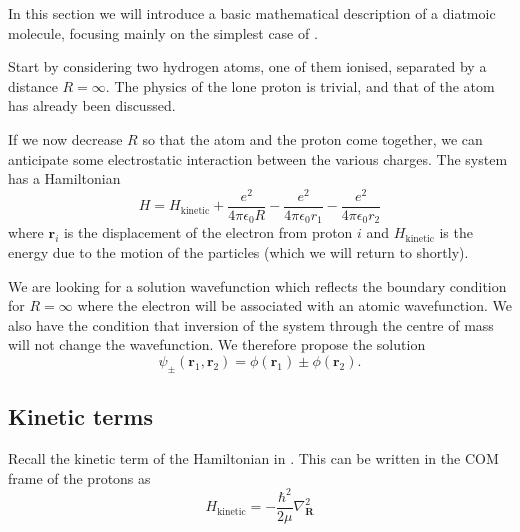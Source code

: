 In this section we will introduce a basic mathematical description of a diatmoic
molecule, focusing mainly on the simplest case of .

Start by considering two hydrogen atoms, one of them ionised, separated by a
distance $R = \infty$. The physics of the lone proton is trivial, and that of
the atom has already been discussed.

If we now decrease $R$ so that the atom and the proton come together, we can
anticipate some electrostatic interaction between the various charges. The
system has a Hamiltonian
%
\begin{equation}
  H = H_\text{kinetic} + \frac{e^2}{4\pi\epsilon_0 R} -
  \frac{e^2}{4\pi\epsilon_0 r_1} - \frac{e^2}{4\pi\epsilon_0 r_2}
\end{equation}
%
where $\mathbf{r}_i$ is the displacement of the electron from proton $i$ and
$H_\text{kinetic}$ is the energy due to the motion of the particles (which we
will return to shortly).

We are looking for a solution wavefunction which reflects the boundary condition
for $R=\infty$ where the electron will be associated with an atomic
wavefunction. We also have the condition that inversion of the system through
the centre of mass will not change the wavefunction. We therefore propose the
solution
%
\begin{equation}
  \psi_\pm(\mathbf{r}_1, \mathbf{r}_2) = \phi(\mathbf{r}_1) \pm \phi(\mathbf{r}_2).
\end{equation}
%


\subsection{Kinetic terms}

Recall the kinetic term of the Hamiltonian in . This can be
written in the COM frame of the protons as
%
\begin{equation}
  H_\text{kinetic} = - \frac{\hbar^2}{2\mu} \nabla^2_\mathbf{R} %
\end{equation}
